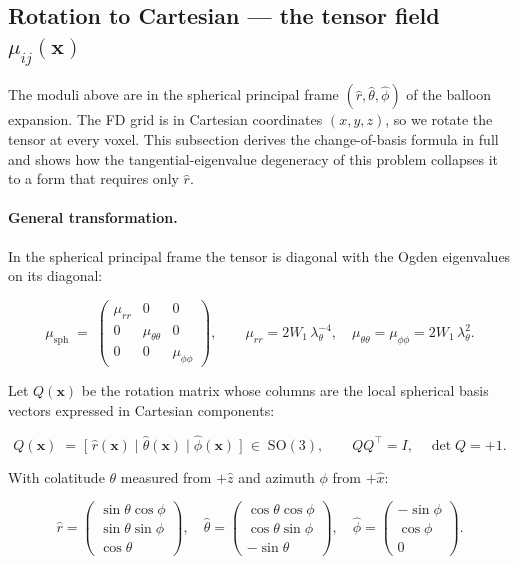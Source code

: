 \documentclass[11pt,letterpaper]{article}
\newcommand{\vect}[1]{\boldsymbol{#1}}
\begin{document}
\subsection{Rotation to Cartesian --- the tensor field $\mu_{ij}(\vect x)$}
\label{sec:rotation}

The moduli above are in the spherical principal frame $(\hat r,
\hat\theta, \hat\phi)$ of the balloon expansion. The FD grid is in
Cartesian coordinates $(x, y, z)$, so we rotate the tensor at every
voxel. This subsection derives the change-of-basis formula in full
and shows how the tangential-eigenvalue degeneracy of this problem
collapses it to a form that requires only $\hat r$.

\paragraph{General transformation.}
In the spherical principal frame the tensor is diagonal with the
Ogden eigenvalues on its diagonal:

\begin{equation}
\mu_{\text{sph}}
\;=\;
\begin{pmatrix}
\mu_{rr}       & 0                    & 0 \\
0              & \mu_{\theta\theta}   & 0 \\
0              & 0                    & \mu_{\phi\phi}
\end{pmatrix},
\qquad
\mu_{rr} = 2 W_1\,\lambda_\theta^{-4},
\quad
\mu_{\theta\theta} = \mu_{\phi\phi} = 2 W_1\,\lambda_\theta^{2}.
\label{eq:musph}
\end{equation}

Let $Q(\vect x)$ be the rotation matrix whose columns are the local
spherical basis vectors expressed in Cartesian components:

\begin{equation}
Q(\vect x) \;=\;
\bigl[\;\hat r(\vect x)\;\big|\;\hat\theta(\vect x)\;\big|\;\hat\phi(\vect x)\;\bigr]
\;\in\;\mathrm{SO}(3),
\qquad
Q Q^{\!\top} = I,\quad \det Q = +1.
\label{eq:Qdef}
\end{equation}

With colatitude $\theta$ measured from $+\hat z$ and azimuth $\phi$
from $+\hat x$:

\begin{equation}
\hat r =
\!\begin{pmatrix}\sin\theta\cos\phi\\ \sin\theta\sin\phi\\ \cos\theta\end{pmatrix}\!,
\quad
\hat\theta =
\!\begin{pmatrix}\cos\theta\cos\phi\\ \cos\theta\sin\phi\\ -\sin\theta\end{pmatrix}\!,
\quad
\hat\phi =
\!\begin{pmatrix}-\sin\phi\\ \cos\phi\\ 0\end{pmatrix}\!.
\label{eq:basis}
\end{equation}
\end{document}
